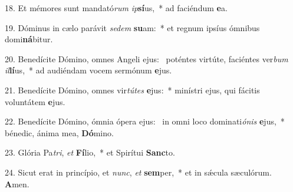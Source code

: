 18. Et mémores sunt mandató\textit{rum} \textit{ip}\textbf{sí}us,~*  ad faciéndum \textbf{e}a.\

19. Dóminus in cælo parávit \textit{se}\textit{dem} \textbf{su}am:~*  et regnum ipsíus ómnibus domi\textbf{ná}bitur.\

20. Benedícite Dómino, omnes Angeli ejus: \dag\  poténtes virtúte, faciéntes ver\textit{bum} \textit{il}\textbf{lí}us,~*  ad audiéndam vocem sermónum \textbf{e}jus.\

21. Benedícite Dómino, omnes vir\textit{tú}\textit{tes} \textbf{e}jus:~*  minístri ejus, qui fácitis voluntátem \textbf{e}jus.\

22. Benedícite Dómino, ómnia ópera ejus: \dag\  in omni loco dominati\textit{ó}\textit{nis} \textbf{e}jus,~*  bénedic, ánima mea, \textbf{Dó}mino.\

23. Glória Pa\textit{tri}, \textit{et} \textbf{Fí}lio,~*  et Spirítui \textbf{Sanc}to.\

24. Sicut erat in princípio, et \textit{nunc}, \textit{et} \textbf{sem}per,~*  et in sǽcula sæculórum. \textbf{A}men.\

